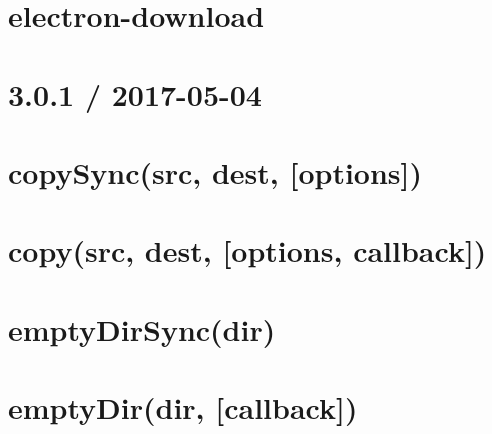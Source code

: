 \documentclass[twoside]{book}
\newcommand{\+}{\discretionary{\mbox{\scriptsize$\hookleftarrow$}}{}{}}
\begin{document}
\chapter{electron-\/download}
\label{md_dsmacc_vis_degree_node_modules_electron-packager_node_modules_electron-download_readme}

\chapter{3.0.1 / 2017-\/05-\/04}
\label{md_dsmacc_vis_degree_node_modules_electron-packager_node_modules_fs-extra_CHANGELOG}

\chapter{copy\+Sync(src, dest, \mbox{[}options\mbox{]})}
\label{md_dsmacc_vis_degree_node_modules_electron-packager_node_modules_fs-extra_docs_copy-sync}

\chapter{copy(src, dest, \mbox{[}options, callback\mbox{]})}
\label{md_dsmacc_vis_degree_node_modules_electron-packager_node_modules_fs-extra_docs_copy}

\chapter{empty\+Dir\+Sync(dir)}
\label{md_dsmacc_vis_degree_node_modules_electron-packager_node_modules_fs-extra_docs_emptyDir-sync}

\chapter{empty\+Dir(dir, \mbox{[}callback\mbox{]})}
\label{md_dsmacc_vis_degree_node_modules_electron-packager_node_modules_fs-extra_docs_emptyDir}

\end{document}
